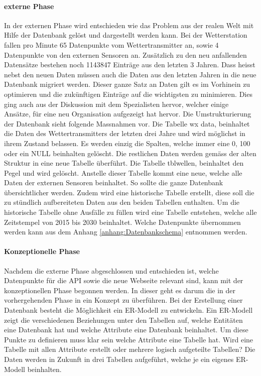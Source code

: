 \paragraph{externe Phase}

In der externen Phase wird entschieden wie das Problem aus der realen Welt mit Hilfe der Datenbank gelöst und dargestellt werden kann. Bei der Wetterstation fallen pro Minute 65 Datenpunkte vom Wettertransmitter an, sowie 4 Datenpunkte von den externen Sensoren an. Zusätzlich zu den neu anfallenden Datensätze bestehen noch 1143847 Einträge aus den letzten 3 Jahren. Dass heisst nebst den neuen Daten müssen auch die Daten aus den letzten Jahren in die neue Datenbank migriert werden. Dieser ganze Satz an Daten gilt es im Vorhinein zu optimieren und die zukünftigen Einträge auf die wichtigsten zu minimieren. Dies ging auch aus der Diskussion mit dem Spezialisten hervor, welcher einige Ansätze, für eine neu Organisation aufgezeigt hat hervor. Die Umstrukturierung der Datenbank sieht folgende Massnahmen vor. Die Tabelle wx data, beinhaltet die Daten des Wettertransmitters der letzten drei Jahre und wird möglichst in ihrem Zustand belassen. Es werden einzig die Spalten, welche immer eine 0, 100 oder ein NULL beinhalten gelöscht. Die restlichen Daten werden gemäss der alten Struktur in eine neue Tabelle überführt. Die Tabelle tblwellen, beinhaltet den Pegel und wird gelöscht. Anstelle dieser Tabelle kommt eine neue, welche alle Daten der externen Sensoren beinhaltet. So sollte die ganze Datenbank übersichtlicher werden. Zudem wird eine historische Tabelle erstellt, diese soll die zu stündlich aufbereiteten Daten aus den beiden Tabellen enthalten. Um die historische Tabelle ohne Ausfälle zu füllen wird eine Tabelle entstehen, welche alle Zeitstempel von 2015 bis 2030 beinhaltet. Welche Datenpunkte übernommen werden kann aus dem Anhang \ref{anhang:Datenbankschema} entnommen werden.\\

\paragraph{Konzeptionelle Phase}

Nachdem die externe Phase abgeschlossen und entschieden ist, welche Datenpunkte für die API sowie die neue Webseite relevant sind, kann mit der konzeptionellen Phase begonnen werden. In dieser geht es darum die in der vorhergehenden Phase in ein Konzept zu überführen. Bei der Erstellung einer Datenbank besteht die Möglichkeit ein ER-Modell zu entwickeln. Ein ER-Modell zeigt die verschiedenen Beziehungen unter den Tabellen auf, welche Entitäten eine Datenbank hat und welche Attribute eine Datenbank beinhaltet.\cite{FrankGeisler2011mitpu} Um diese Punkte zu definieren muss klar sein welche Attribute eine Tabelle hat. Wird eine Tabelle mit allen Attribute erstellt oder mehrere logisch aufgeteilte Tabellen? Die Daten werden in Zukunft in drei Tabellen aufgeführt, welche je ein eigenes ER-Modell beinhalten.\\

